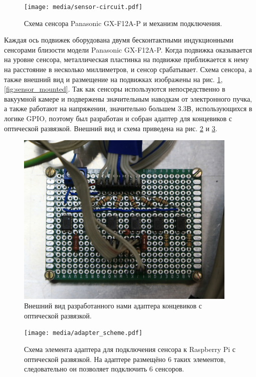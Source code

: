 \documentclass[14pt,russian,a4paper]{extarticle}
\begin{document}
\begin{figure}[h!]
    \centerline{\texttt{[image: media/sensor-circuit.pdf]}}
    \caption{Схема сенсора Panasonic GX-F12A-P и механизм подключения.}
    \label{fig:sensor_circuit}
\end{figure}

Каждая ось подвижек оборудована двумя бесконтактными индукционными сенсорами близости модели Panasonic GX-F12A-P. Когда подвижка оказывается на уровне сенсора, металлическая пластинка на подвижке приближается к нему на расстояние в несколько миллиметров, и сенсор срабатывает. Схема сенсора, а также внешний вид и размещение на подвижках изображены на рис. \ref{fig:sensor_circuit}, \ref{fig:sensor_mounted}. 
\newline
Так как сенсоры используются непосредственно в вакуумной камере и подвержены значительным наводкам от электронного пучка, а также работают на напряжении, значительно большем 3.3В, использующихся в логике GPIO, поэтому был разработан и собран адаптер для концевиков с оптической развязкой. Внешний вид и схема приведена на рис. \ref{fig:adapter} и \ref{fig:adapter_circuit}.
\newline

\begin{figure}[h!]
    \centerline{\includegraphics[width=300pt]{media/adapter.jpg}}
    \caption{Внешний вид разработанного нами адаптера концевиков с оптической развязкой.}
    \label{fig:adapter}
\end{figure}

\begin{figure}[h!]
    \centerline{\texttt{[image: media/adapter\_scheme.pdf]}}
    \caption{Схема элемента адаптера для подключения сенсора к Raspberry Pi с оптической развязкой. На адаптере размещёно 6 таких элементов, следовательно он позволяет подключить 6 сенсоров.}
    \label{fig:adapter_circuit}
\end{figure}
\end{document}
